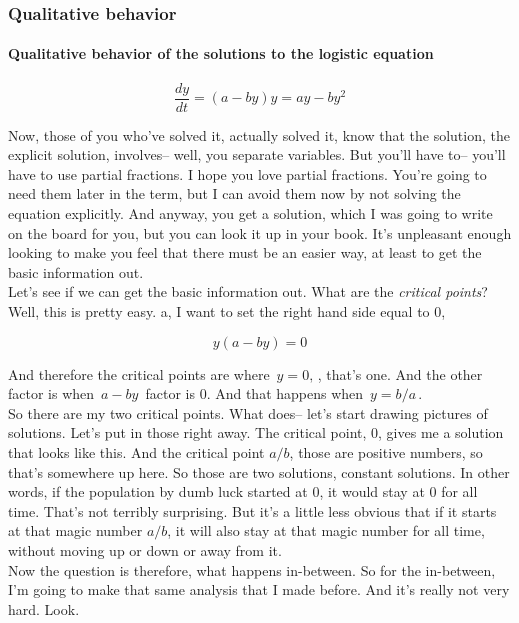 \clearpage

\subsubsection{Qualitative behavior}

\paragraph{Qualitative behavior of the solutions to the logistic equation}

\begin{equation*}
  \frac{dy}{dt} = (a - by)y = ay -by^2
\end{equation*}

Now, those of you who've solved it, actually solved it,
know that the solution, the explicit solution,
involves-- well, you separate variables.
But you'll have to--
you'll have to use partial fractions.
I hope you love partial fractions.
You're going to need them later in the term,
but I can avoid them now by not solving
the equation explicitly.
And anyway, you get a solution, which
I was going to write on the board for you,
but you can look it up in your book.
It's unpleasant enough looking to make
you feel that there must be an easier way, at least to get
the basic information out. \\
Let's see if we can get the basic information out.
What are the \emph{critical points}?\\
Well, this is pretty easy.
a, I want to set the right hand side equal to $0$,

\begin{equation*}
  y(a -by) = 0
\end{equation*}

And therefore the critical points are where $\, y = 0 ,\,$, that's one.
And the other factor is when $\, a - by\, $ factor is $0$.
And that happens when $\, y = b/a\,$. \\
So there are my two critical points.
What does-- let's start drawing pictures of solutions.
Let's put in those right away.
The critical point, $0$, gives me a solution
that looks like this.
And the critical point $a/b$, those are positive numbers, so that's somewhere up here.
So those are two solutions, constant solutions.
In other words, if the population by dumb luck started at $0$, it would stay at $0$ for all time.
That's not terribly surprising.
But it's a little less obvious that if it starts
at that magic number $a/b$, it will also stay at that magic number for all time, without moving up
or down or away from it.\\
Now the question is therefore, what happens in-between.
So for the in-between, I'm going to make that same analysis
that I made before.
And it's really not very hard.
Look.

